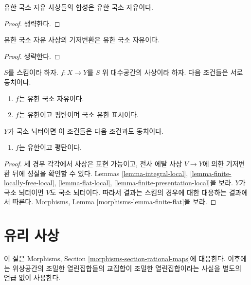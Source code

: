 \begin{lemma}
\label{lemma-composition-finite-locally-free}
유한 국소 자유 사상들의 합성은 유한 국소 자유이다.
\end{lemma}

\begin{proof}
생략한다.
\end{proof}

\begin{lemma}
\label{lemma-base-change-finite-locally-free}
유한 국소 자유 사상의 기저변환은 유한 국소 자유이다.
\end{lemma}

\begin{proof}
생략한다.
\end{proof}

\begin{lemma}
\label{lemma-finite-flat}
$S$를 스킴이라 하자.
$f : X \to Y$를 $S$ 위 대수공간의 사상이라 하자.
다음 조건들은 서로 동치이다.
\begin{enumerate}
\item $f$는 유한 국소 자유이다.
\item $f$는 유한이고 평탄이며 국소 유한 표시이다.
\end{enumerate}
$Y$가 국소 뇌터이면 이 조건들은 다음 조건과도 동치이다.
\begin{enumerate}
\item[(3)] $f$는 유한이고 평탄이다.
\end{enumerate}
\end{lemma}

\begin{proof}
세 경우 각각에서 사상은 표현 가능이고, 전사 에탈 사상 $V \to Y$에 의한
기저변환 뒤에 성질을 확인할 수 있다. Lemmas
\ref{lemma-integral-local},
\ref{lemma-finite-locally-free-local},
\ref{lemma-flat-local},
\ref{lemma-finite-presentation-local}을 보라.
$Y$가 국소 뇌터이면 $V$도 국소 뇌터이다. 따라서 결과는 스킴의 경우에
대한 대응하는 결과에서 따른다. Morphisms, Lemma
\ref{morphisms-lemma-finite-flat}을 보라.
\end{proof}





\section{유리 사상}
\label{section-rational-maps}

\noindent
이 절은 Morphisms, Section \ref{morphisms-section-rational-maps}에 대응한다.
이후에는 위상공간의 조밀한 열린집합들의 교집합이 조밀한 열린집합이라는
사실을 별도의 언급 없이 사용한다.

